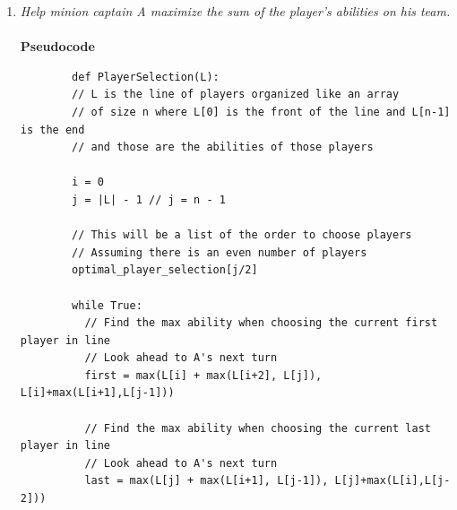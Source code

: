 \documentclass[12pt]{article}
\begin{document}
\begin{enumerate}
		\newpage
		\item \textit{Help minion captain A maximize the sum of the player's abilities on his team.}\\
		\\
		\textbf{Pseudocode}
		\begin{verbatim}
		def PlayerSelection(L):
		// L is the line of players organized like an array
		// of size n where L[0] is the front of the line and L[n-1] is the end
		// and those are the abilities of those players

		i = 0
		j = |L| - 1 // j = n - 1

		// This will be a list of the order to choose players
		// Assuming there is an even number of players
		optimal_player_selection[j/2] 

		while True:
		  // Find the max ability when choosing the current first player in line
		  // Look ahead to A's next turn
		  first = max(L[i] + max(L[i+2], L[j]), L[i]+max(L[i+1],L[j-1]))

		  // Find the max ability when choosing the current last player in line
		  // Look ahead to A's next turn
		  last = max(L[j] + max(L[i+1], L[j-1]), L[j]+max(L[i],L[j-2]))


\end{verbatim}
\end{enumerate}
\end{document}
